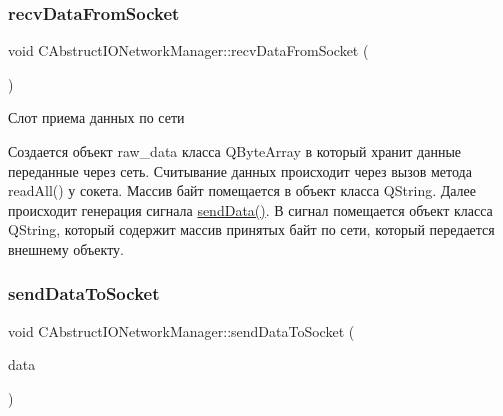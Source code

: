 \hypertarget{class_c_abstruct_i_o_network_manager_a78756fc08ed619162da210a9cfc09208}{}\label{class_c_abstruct_i_o_network_manager_a78756fc08ed619162da210a9cfc09208} 
\subsubsection{\texorpdfstring{recv\+Data\+From\+Socket}{recvDataFromSocket}}
{\footnotesize\ttfamily void C\+Abstruct\+I\+O\+Network\+Manager\+::recv\+Data\+From\+Socket (\begin{DoxyParamCaption}{ }\end{DoxyParamCaption})\hspace{0.3cm}{\ttfamily [slot]}}



Слот приема данных по сети 

Создается объект raw\+\_\+data класса Q\+Byte\+Array в который хранит данные переданные через сеть. Считывание данных происходит через вызов метода read\+All() у сокета. Массив байт помещается в объект класса Q\+String. Далее происходит генерация сигнала \hyperlink{class_c_abstruct_controller_item_a7cf2bebc87a7d0b660318e946a176eb9}{send\+Data()}. В сигнал помещается объект класса Q\+String, который содержит массив принятых байт по сети, который передается внешнему объекту. \hypertarget{class_c_abstruct_i_o_network_manager_a7e6c20ce1264c76a2cc66114f8490629}{}\label{class_c_abstruct_i_o_network_manager_a7e6c20ce1264c76a2cc66114f8490629} 
\subsubsection{\texorpdfstring{send\+Data\+To\+Socket}{sendDataToSocket}}
{\footnotesize\ttfamily void C\+Abstruct\+I\+O\+Network\+Manager\+::send\+Data\+To\+Socket (\begin{DoxyParamCaption}\item[{Q\+String $\ast$}]{data }\end{DoxyParamCaption})\hspace{0.3cm}{\ttfamily [slot]}}



